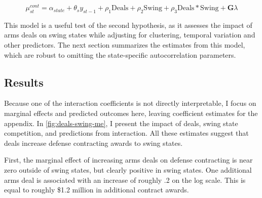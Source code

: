 \documentclass[12pt]{article}
\begin{document}
\begin{equation}
\mu_{st}^{cont} = \alpha_{state} + \theta_s y_{st-1} + \rho_1 \mbox{Deals} + \rho_2 \mbox{Swing} + \rho_3 \mbox{Deals} * \mbox{Swing} + \textbf{G} \lambda
\end{equation}


This model is a useful test of the second hypothesis, as it assesses the impact of arms deals on swing states while adjusting for clustering, temporal variation and other predictors.%
The next section summarizes the estimates from this model, which are robust to omitting the state-specific autocorrelation parameters. 


\subsection{Results}


Because one of the interaction coefficients is not directly interpretable, I focus on marginal effects and predicted outcomes here, leaving coefficient estimates for the appendix.
In \autoref{fig:deals-swing-me}, I present the impact of deals, swing state competition, and predictions from interaction.
All these estimates suggest that deals increase defense contracting awards to swing states. 


First, the marginal effect of increasing arms deals on defense contracting is near zero outside of swing states, but clearly positive in swing states. 
One additional arms deal is associated with an increase of roughly .2 on the log scale.
This is equal to roughly \$1.2 million in additional contract awards. 
\end{document}
